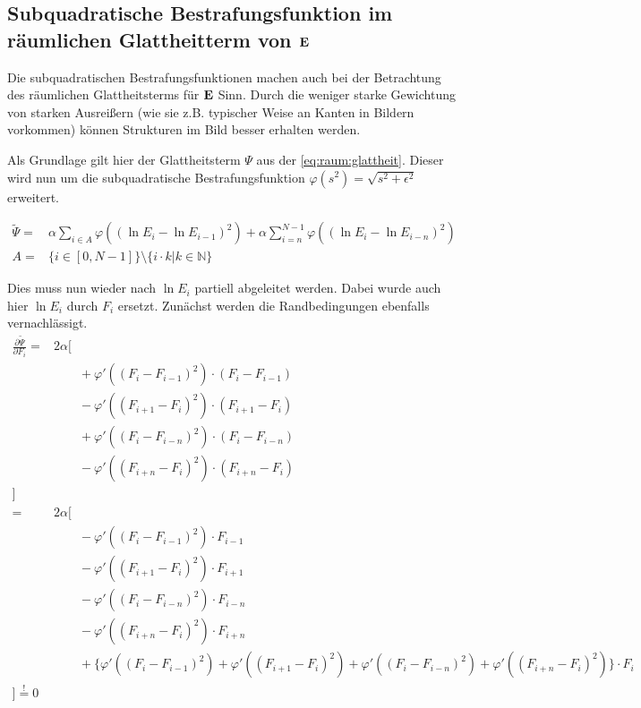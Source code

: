 \subsection{Subquadratische Bestrafungsfunktion im räumlichen Glattheitterm von $\mathbf E$}
\label{subsec:robust:e:raum}
Die subquadratischen Bestrafungsfunktionen machen auch bei der Betrachtung des räumlichen Glattheitsterms für $\mathbf E$ 
Sinn. Durch die weniger starke Gewichtung von starken Ausreißern (wie sie z.B. typischer Weise an Kanten in Bildern vorkommen) können Strukturen im Bild besser erhalten werden.

Als Grundlage gilt hier der Glattheitsterm $\Psi$ aus der \autoref{eq:raum:glattheit}. Dieser wird nun um die subquadratische Bestrafungsfunktion $\varphi(s^2) = \sqrt{s^2+\epsilon^2}$ erweitert.

\begin{align}
\label{eq:robust:raum}
\tilde{\Psi} =& 
        \alpha \sum_{i\in A}
            \varphi((\ln E_i - \ln E_{i-1})^2)
        +\alpha \sum_{i=n}^{N-1}\varphi((\ln E_i - \ln E_{i-n})^2)
    \\
    A=& \{ i \in [0,N-1]\} \setminus \{ i \cdot k | k \in \mathbb{N} \}
\end{align}

Dies muss nun wieder nach $\ln E_i$ partiell abgeleitet werden. Dabei wurde auch hier $\ln E_i$ durch $F_i$ ersetzt. Zunächst werden die Randbedingungen ebenfalls vernachlässigt.
\begin{align}
\frac{\partial \tilde \Psi}{\partial F_i} =& 2\alpha[ \nonumber\\
    & \qquad + \varphi'((F_i - F_{i-1})^2)     \cdot (F_i - F_{i-1}) \nonumber\\
    & \qquad - \varphi'((F_{i+1} - F_{i})^2)   \cdot (F_{i+1} - F_i) \nonumber\\
    & \qquad + \varphi'((F_i - F_{i-n})^2)     \cdot (F_i - F_{i-n})\nonumber\\
    & \qquad - \varphi'((F_{i+n} - F_{i})^2)   \cdot (F_{i+n}- F_i)\nonumber\\
    ]\\
=& 2\alpha[ \nonumber\\
    & \qquad - \varphi'((F_i - F_{i-1})^2)     \cdot F_{i-1} \nonumber\\
    & \qquad - \varphi'((F_{i+1} - F_{i})^2)   \cdot F_{i+1} \nonumber\\
    & \qquad - \varphi'((F_i - F_{i-n})^2)     \cdot F_{i-n} \nonumber\\
    & \qquad - \varphi'((F_{i+n} - F_{i})^2)   \cdot F_{i+n} \nonumber\\
    & \qquad + \{\varphi'((F_i - F_{i-1})^2) + \varphi'((F_{i+1} - F_{i})^2) +\varphi'((F_i - F_{i-n})^2) + \varphi'((F_{i+n} - F_{i})^2)\} \cdot F_i \nonumber\\
    ] \overset{!}{=} 0
\end{align}

